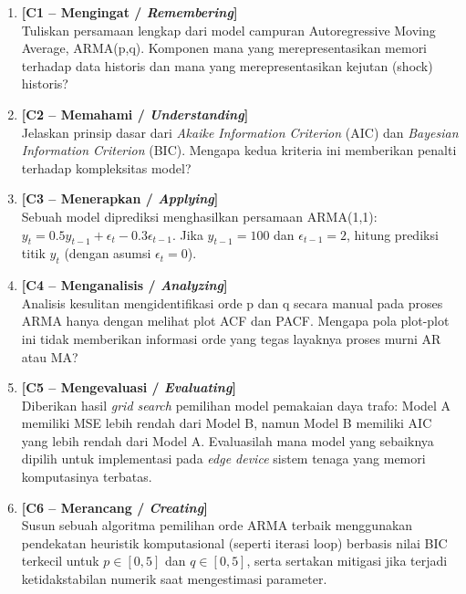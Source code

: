 \documentclass[11pt,a4paper]{article}
\begin{document}
\begin{enumerate}[leftmargin=1.8em, label=\textbf{Soal \arabic*.}]
    
    \item \textbf{[C1 -- Mengingat / \textit{Remembering}]} \\
    Tuliskan persamaan lengkap dari model campuran Autoregressive Moving Average, ARMA(p,q). Komponen mana yang merepresentasikan memori terhadap data historis dan mana yang merepresentasikan kejutan (shock) historis?
    \vspace{2.2cm}

    \item \textbf{[C2 -- Memahami / \textit{Understanding}]} \\
    Jelaskan prinsip dasar dari \textit{Akaike Information Criterion} (AIC) dan \textit{Bayesian Information Criterion} (BIC). Mengapa kedua kriteria ini memberikan penalti terhadap kompleksitas model?
    \vspace{2.8cm}

    \item \textbf{[C3 -- Menerapkan / \textit{Applying}]} \\
    Sebuah model diprediksi menghasilkan persamaan ARMA(1,1): $y_t = 0.5 y_{t-1} + \epsilon_t - 0.3 \epsilon_{t-1}$. Jika $y_{t-1} = 100$ dan $\epsilon_{t-1} = 2$, hitung prediksi titik $y_t$ (dengan asumsi $\epsilon_t = 0$).
    \vspace{2.8cm}

    \newpage

    \item \textbf{[C4 -- Menganalisis / \textit{Analyzing}]} \\
    Analisis kesulitan mengidentifikasi orde p dan q secara manual pada proses ARMA hanya dengan melihat plot ACF dan PACF. Mengapa pola plot-plot ini tidak memberikan informasi orde yang tegas layaknya proses murni AR atau MA?
    \vspace{3.5cm}

    \item \textbf{[C5 -- Mengevaluasi / \textit{Evaluating}]} \\
    Diberikan hasil \textit{grid search} pemilihan model pemakaian daya trafo: Model A memiliki MSE lebih rendah dari Model B, namun Model B memiliki AIC yang lebih rendah dari Model A. Evaluasilah mana model yang sebaiknya dipilih untuk implementasi pada \textit{edge device} sistem tenaga yang memori komputasinya terbatas.
    \vspace{3.5cm}

    \item \textbf{[C6 -- Merancang / \textit{Creating}]} \\
    Susun sebuah algoritma pemilihan orde ARMA terbaik menggunakan pendekatan heuristik komputasional (seperti iterasi loop) berbasis nilai BIC terkecil untuk $p \in [0, 5]$ dan $q \in [0, 5]$, serta sertakan mitigasi jika terjadi ketidakstabilan numerik saat mengestimasi parameter.
    \vspace{4.5cm}

\end{enumerate}
\end{document}
